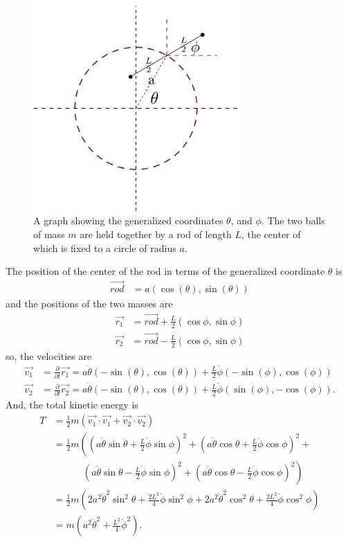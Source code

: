 \documentclass[10pt]{article}
\begin{document}
\begin{figure}[h!]
    \centering
    \includegraphics[width=0.7\textwidth]{Ex14.png}
    \caption{A graph showing the generalized coordinates $\theta$, and $\phi$.  The two balls of mass $m$ are held together by a rod of length $L$, the center of which is fixed to a circle of radius $a$.}
  \label{fig:ex14}
\end{figure}
The position of the center of the rod in terms of the generalized coordinate $\theta$ is
\begin{align*}
  \vec{rod} &= a(\cos(\theta),\sin(\theta))
\end{align*}
and the positions of the two masses are
\begin{align*}
  \vec{r_1} &= \vec{rod}+\frac{L}{2}(\cos\phi, \sin\phi)\\
  \vec{r_2} &= \vec{rod}-\frac{L}{2}(\cos\phi, \sin\phi)
\end{align*}
so, the velocities are
\begin{align*}
  \vec{v_1} &= \frac{\partial}{\partial t} \vec{r_1} = a\dot\theta(-\sin(\theta),\cos(\theta)) + \frac{L}{2}\dot\phi(-\sin(\phi),\cos(\phi))\\
  \vec{v_2} &= \frac{\partial}{\partial t} \vec{r_2} = a\dot\theta(-\sin(\theta),\cos(\theta)) + \frac{L}{2}\dot\phi(\sin(\phi),-\cos(\phi)).
\end{align*}
And, the total kinetic energy is
\begin{align*}
  T &= \frac{1}{2}m\left( \vec{v_1}\cdot\vec{v_1} + \vec{v_2}\cdot\vec{v_2} \right)\\
  &= \frac{1}{2}m\left( \left( a\dot\theta\sin\theta+\frac{L}{2}\dot\phi\sin\phi \right)^2 + \left( a\dot\theta\cos\theta+\frac{L}{2}\dot\phi\cos\phi \right)^2 \right.+\\
  &\hspace{37pt}\left.\left( a\dot\theta\sin\theta-\frac{L}{2}\dot\phi\sin\phi \right)^2 + \left( a\dot\theta\cos\theta-\frac{L}{2}\dot\phi\cos\phi \right)^2  \right) \\
  &= \frac{1}{2}m\left( 2a^2\dot\theta^2\sin^2\theta+\frac{2L^2}{4}\dot\phi\sin^2\phi+2a^2\dot\theta^2\cos^2\theta+\frac{2L^2}{4}\dot\phi\cos^2\phi \right)\\
  &= m(a^2\dot\theta^2+\frac{L^2}{4}\dot\phi^2).
\end{align*}
\end{document}
